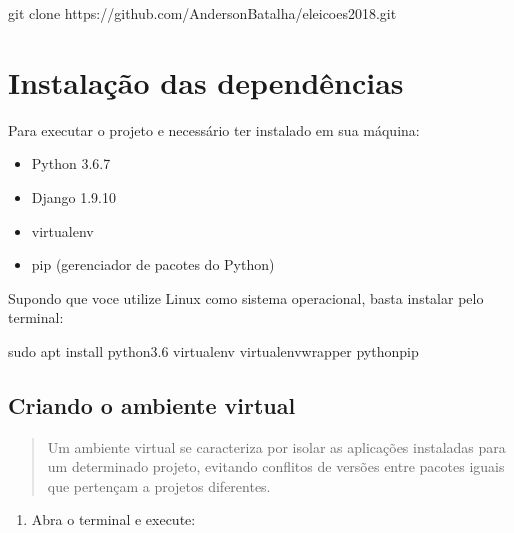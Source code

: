 \documentclass[letterpaper,10pt,portuges]{sphinxmanual}
\begin{document}
%
\begin{sphinxVerbatim}[commandchars=\\\{\}]
\PYGZdl{} git clone https://github.com/AndersonBatalha/eleicoes2018.git
\end{sphinxVerbatim}


\chapter{Instalação das dependências}
\label{\detokenize{instalacao_dependencias:instalacao-das-dependencias}}\label{\detokenize{instalacao_dependencias::doc}}
Para executar o projeto e necessário ter instalado em sua máquina:
\begin{itemize}
\item {} 
Python 3.6.7

\item {} 
Django 1.9.10

\item {} 
virtualenv

\item {} 
pip (gerenciador de pacotes do Python)

\end{itemize}

Supondo que voce utilize Linux como sistema operacional, basta instalar pelo terminal:

%
\begin{sphinxVerbatim}[commandchars=\\\{\}]
\PYGZdl{} sudo apt install python3.6 virtualenv virtualenvwrapper python\PYGZhy{}pip
\end{sphinxVerbatim}


\section{Criando o ambiente virtual}
\label{\detokenize{instalacao_dependencias:criando-o-ambiente-virtual}}\begin{quote}

Um ambiente virtual se caracteriza por isolar as aplicações instaladas para um determinado projeto, evitando conflitos de versões entre pacotes iguais que pertençam a projetos diferentes.
\end{quote}
\begin{enumerate}
\def\theenumi{\arabic{enumi}}
\def\labelenumi{\theenumi .}
\makeatletter\def\p@enumii{\p@enumi \theenumi .}\makeatother
\item {} 
Abra o terminal e execute:

\end{enumerate}
\end{document}
